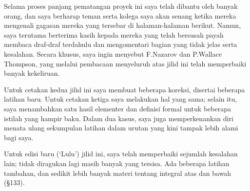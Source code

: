 Selama proses panjang pematangan proyek ini saya telah dibantu oleh banyak
orang, dan saya berharap teman serta kolega saya akan senang ketika mereka
mengenali gagasan mereka yang tersebar di halaman-halaman berikut.   Namun,
saya terutama berterima kasih kepada mereka yang telah bersusah payah membaca
draf-draf terdahulu dan mengomentari bagian yang tidak jelas serta kesalahan.
Secara khusus, saya ingin menyebut F.Nazarov dan P.Wallace Thompson, yang melalui 
pembacaan menyeluruh atas jilid ini telah memperbaiki banyak kekeliruan.



\medskip



\bigskip


\medskip

Untuk cetakan kedua jilid ini saya membuat beberapa koreksi, disertai
beberapa latihan baru.   Untuk cetakan ketiga saya melakukan hal yang sama;
selain itu, saya menambahkan satu hasil elementer dan definisi formal
untuk beberapa istilah yang hampir baku.   Dalam dua kasus, saya juga
memperkenankan diri menata ulang sekumpulan latihan dalam urutan yang kini
tampak lebih alami bagi saya.

\bigskip


\medskip

Untuk edisi baru (`Lulu') jilid ini, saya telah memperbaiki sejumlah
kesalahan lain;  tidak diragukan lagi masih banyak yang tersisa.   Ada beberapa
latihan tambahan, dan sedikit lebih banyak materi tentang integral atas dan
bawah (\S133).
